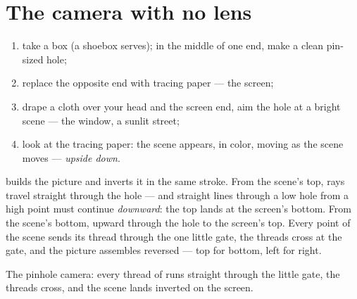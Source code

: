 \section{The camera with no lens}

\begin{method}\label{met:g6:light-propagation:pinhole}
\begin{enumerate}
  \item take a box (a shoebox serves); in the middle of one end,
        make a clean pin-sized hole;
  \item replace the opposite end with tracing paper --- the
        screen;
  \item drape a cloth over your head and the screen end, aim the
        hole at a bright scene --- the window, a sunlit street;
  \item look at the tracing paper: the scene appears, in color,
        moving as the scene moves --- \emph{upside down}.
\end{enumerate}
\end{method}

\begin{proposition}\label{prop:g6:light-propagation:inverted}
 builds the picture and inverts it in the
same stroke. From the scene's top, rays travel straight through
the hole --- and straight lines through a low hole from a high
point must continue \emph{downward}: the top lands at the screen's
bottom. From the scene's bottom, upward through the hole to the
screen's top. Every point of the scene sends its thread through
the one little gate, the threads cross at the gate, and the
picture assembles reversed --- top for bottom, left for right.
\end{proposition}

\begin{omfigure}

{\small The pinhole camera: every thread of  runs straight
through the little gate, the threads cross, and the scene lands
inverted on the screen.}
\end{omfigure}

